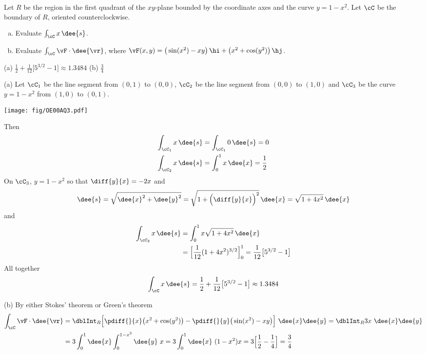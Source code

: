 \begin{question}[M317 2000A] %
Let $R$ be the region in the first quadrant of the $xy$-plane
bounded by the coordinate axes and the curve $y=1-x^2$. Let $\cC$ be the
boundary of $R$, oriented counterclockwise.
\begin{enumerate}[(a)]
\item
Evaluate $\int_\cC x\,\dee{s}$.
\item
 Evaluate $\int_\cC \vF\cdot \dee{\vr}$, where $\vF(x,y)
=\big(\sin(x^2)-xy\big)\,\hi+\big(x^2+\cos(y^2)\big)\,\hj$.
\end{enumerate}
\end{question}


\begin{answer}
(a) $\frac{1}{2}+\frac{1}{12}\big[5^{3/2}-1\big]\approx 1.3484$\qquad
(b) $\frac{3}{4}$
\end{answer}

\begin{solution}
(a) Let $\cC_1$ be the line segment from $(0,1)$ to $(0,0)$,
$\cC_2$ be the line segment from $(0,0)$ to $(1,0)$ and
$\cC_3$ be the curve $y=1-x^2$ from $(1,0)$ to $(0,1)$.

\begin{center}
   \texttt{[image: fig/OE00AQ3.pdf]}
\end{center}


 Then
\begin{align*}
\int_{\cC_1} x\,\dee{s}&=\int_{\cC_1} 0\,\dee{s}=0\\
\int_{\cC_2} x\,\dee{s}&=\int_0^1 x\,\dee{x}=\frac{1}{2}
\end{align*}
On $\cC_3$, $y=1-x^2$ so that $\diff{y}{x}=-2x$ and
\begin{equation*}
\dee{s} =\sqrt{\dee{x}^2+\dee{y}^2}
        =\sqrt{1+\Big(\diff{y}{x}\Big)^2}\,\dee{x}
        =\sqrt{1+4x^2}\,\dee{x}
\end{equation*}
and
\begin{align*}
\int_{\cC_3} x\,\dee{s}
&%
=\int_0^1 x\sqrt{1+4x^2}\,\dee{x}\\
&=\Big[\frac{1}{12}(1+4x^2)^{3/2}\Big]_0^1
=\frac{1}{12}\big[5^{3/2}-1\big]
\end{align*}
All together
$$
\int_{\cC} x\,\dee{s}=\frac{1}{2}+\frac{1}{12}\big[5^{3/2}-1\big]
\approx 1.3484
$$

(b) By either Stokes' theorem or Green's theorem
\begin{align*}
\int_\cC \vF\cdot \dee{\vr}
&=\dblInt_R\Big[\pdiff{}{x}\big(x^2+\cos(y^2)\big)
-\pdiff{}{y}\big(\sin(x^2)-xy\big) \Big]\ \dee{x} \dee{y}
=\dblInt_R3x\ \dee{x} \dee{y}\\
&=3\int_0^1 \dee{x}\int_0^{1-x^2}\dee{y}\ x
=3\int_0^1 \dee{x}\ (1-x^2) x
=3\Big[\frac{1}{2}-\frac{1}{4}\Big]=\frac{3}{4}
\end{align*}
\end{solution}


